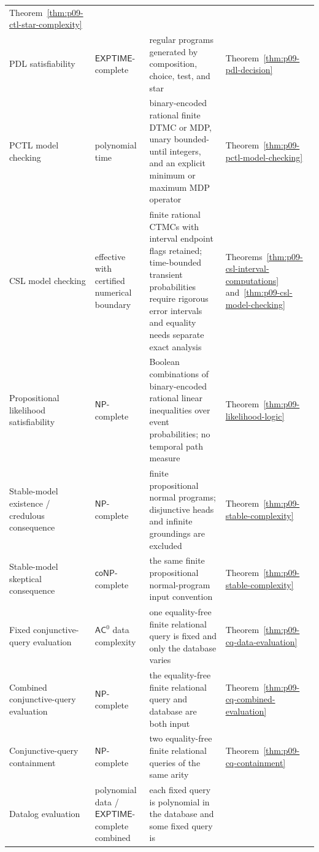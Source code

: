 \begin{longtable}{@{}p{}p{}p{}p{}@{}}
Theorem~\ref{thm:p09-ctl-star-complexity} \\
\addlinespace
PDL satisfiability & \(\mathsf{EXPTIME}\)-complete &
regular programs generated by composition, choice, test, and star &
Theorem~\ref{thm:p09-pdl-decision} \\
\addlinespace
PCTL model checking & polynomial time & binary-encoded rational finite DTMC or
MDP, unary bounded-until integers, and an explicit minimum or maximum MDP
operator &
Theorem~\ref{thm:p09-pctl-model-checking} \\
\addlinespace
CSL model checking & effective with certified numerical boundary & finite
rational CTMCs with interval endpoint flags retained; time-bounded transient
probabilities require rigorous error
intervals and equality needs separate exact analysis &
Theorems~\ref{thm:p09-csl-interval-computations}
and~\ref{thm:p09-csl-model-checking} \\
\addlinespace
Propositional likelihood satisfiability & \(\mathsf{NP}\)-complete & Boolean
combinations of binary-encoded rational linear inequalities over event
probabilities; no temporal path measure &
Theorem~\ref{thm:p09-likelihood-logic} \\
\addlinespace
Stable-model existence / credulous consequence & \(\mathsf{NP}\)-complete &
finite propositional normal programs; disjunctive heads and infinite groundings
are excluded &
Theorem~\ref{thm:p09-stable-complexity} \\
\addlinespace
Stable-model skeptical consequence & \(\mathsf{coNP}\)-complete & the same
finite propositional normal-program input convention &
Theorem~\ref{thm:p09-stable-complexity} \\
\addlinespace
Fixed conjunctive-query evaluation & \(\mathsf{AC}^{0}\) data complexity &
one equality-free finite relational query is fixed and only the database varies
& Theorem~\ref{thm:p09-cq-data-evaluation} \\
\addlinespace
Combined conjunctive-query evaluation & \(\mathsf{NP}\)-complete & the
equality-free finite relational query and database are both input &
Theorem~\ref{thm:p09-cq-combined-evaluation} \\
\addlinespace
Conjunctive-query containment & \(\mathsf{NP}\)-complete & two equality-free
finite relational queries of the same arity &
Theorem~\ref{thm:p09-cq-containment} \\
\addlinespace
Datalog evaluation & polynomial data / \(\mathsf{EXPTIME}\)-complete combined &
each fixed query is polynomial in the database and some fixed query is

\end{longtable}
